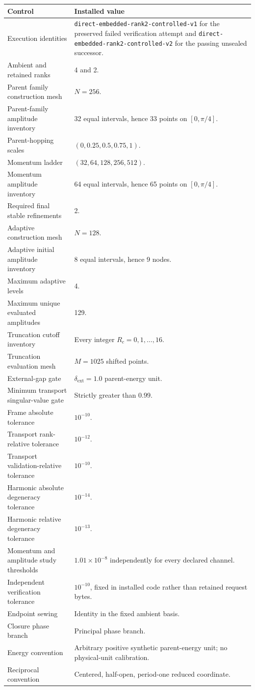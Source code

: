 \begin{longtable}{@{}p{}p{}@{}}
\toprule
Control & Installed value\\
\midrule
\endhead
Execution identities & \texttt{direct-embedded-rank2-controlled-v1} for the preserved failed verification attempt and \texttt{direct-embedded-rank2-controlled-v2} for the passing unsealed successor.\\
Ambient and retained ranks & 4 and 2.\\
Parent family construction mesh & $N=256$.\\
Parent-family amplitude inventory & 32 equal intervals, hence 33 points on $[0,\pi/4]$.\\
Parent-hopping scales & $(0,0.25,0.5,0.75,1)$.\\
Momentum ladder & $(32,64,128,256,512)$.\\
Momentum amplitude inventory & 64 equal intervals, hence 65 points on $[0,\pi/4]$.\\
Required final stable refinements & 2.\\
Adaptive construction mesh & $N=128$.\\
Adaptive initial amplitude inventory & 8 equal intervals, hence 9 nodes.\\
Maximum adaptive levels & 4.\\
Maximum unique evaluated amplitudes & 129.\\
Truncation cutoff inventory & Every integer $R_c=0,1,\ldots,16$.\\
Truncation evaluation mesh & $M=1025$ shifted points.\\
External-gap gate & $\delta_{\mathrm{ext}}=1.0$ parent-energy unit.\\
Minimum transport singular-value gate & Strictly greater than $0.99$.\\
Frame absolute tolerance & $10^{-10}$.\\
Transport rank-relative tolerance & $10^{-12}$.\\
Transport validation-relative tolerance & $10^{-10}$.\\
Harmonic absolute degeneracy tolerance & $10^{-14}$.\\
Harmonic relative degeneracy tolerance & $10^{-13}$.\\
Momentum and amplitude study thresholds & $1.01\times10^{-8}$ independently for every declared channel.\\
Independent verification tolerance & $10^{-10}$, fixed in installed code rather than retained request bytes.\\
Endpoint sewing & Identity in the fixed ambient basis.\\
Closure phase branch & Principal phase branch.\\
Energy convention & Arbitrary positive synthetic parent-energy unit; no physical-unit calibration.\\
Reciprocal convention & Centered, half-open, period-one reduced coordinate.\\
\bottomrule
\end{longtable}


